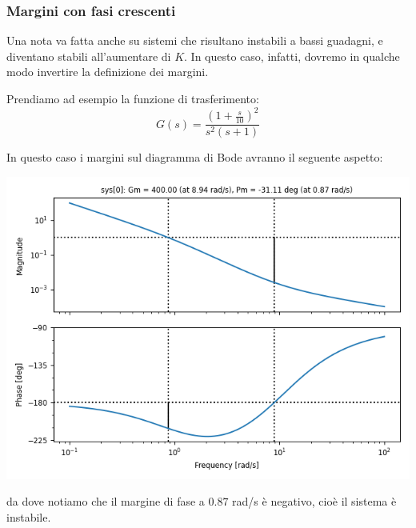 \documentclass[a4paper,11pt]{article}
\begin{document}
\subsubsection{Margini con fasi crescenti}
Una nota va fatta anche su sistemi che risultano instabili a bassi guadagni, e diventano stabili all'aumentare di $K$.
In questo caso, infatti, dovremo in qualche modo invertire la definizione dei margini.

Prendiamo ad esempio la funzione di trasferimento:
$$
G(s) = \frac{\left(1 + \frac{s}{10}\right)^2}{s^2 (s + 1)}
$$

\noindent

\begin{minipage}{\textwidth}

	In questo caso i margini sul diagramma di Bode avranno il seguente aspetto:
	\begin{center}
		\includegraphics[scale=0.75]{../figures/bode_margin_weird.png}
	\end{center}

\end{minipage}

da dove notiamo che il margine di fase a $0.87$ rad/s è negativo, cioè il sistema è instabile.
\end{document}

